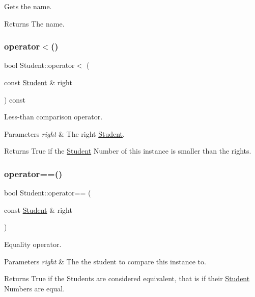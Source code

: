 Gets the name. 

\begin{DoxyReturn}{Returns}
The name. 
\end{DoxyReturn}
\mbox{\label{class_student_a684c89e3452e2aee069029ede12a2519}} 
\subsubsection{\texorpdfstring{operator$<$()}{operator<()}}
{\footnotesize\ttfamily bool Student\+::operator$<$ (\begin{DoxyParamCaption}\item[{const \hyperlink{class_student}{Student} \&}]{right }\end{DoxyParamCaption}) const}



Less-\/than comparison operator. 


\begin{DoxyParams}{Parameters}
{\em right} & The right \hyperlink{class_student}{Student}.\\
\hline
\end{DoxyParams}
\begin{DoxyReturn}{Returns}
True if the \hyperlink{class_student}{Student} Number of this instance is smaller than the right\textquotesingle{}s. 
\end{DoxyReturn}
\mbox{\label{class_student_a424c5ab08bd852565b58c5a61f63d158}} 
\subsubsection{\texorpdfstring{operator==()}{operator==()}}
{\footnotesize\ttfamily bool Student\+::operator== (\begin{DoxyParamCaption}\item[{const \hyperlink{class_student}{Student} \&}]{right }\end{DoxyParamCaption})}



Equality operator. 


\begin{DoxyParams}{Parameters}
{\em right} & The the student to compare this instance to.\\
\hline
\end{DoxyParams}
\begin{DoxyReturn}{Returns}
True if the Students are considered equivalent, that is if their \hyperlink{class_student}{Student} Numbers are equal. 
\end{DoxyReturn}
\mbox{\label{class_student_af57a4b642e4afa314d1a3cdbccc7ff76}} 
